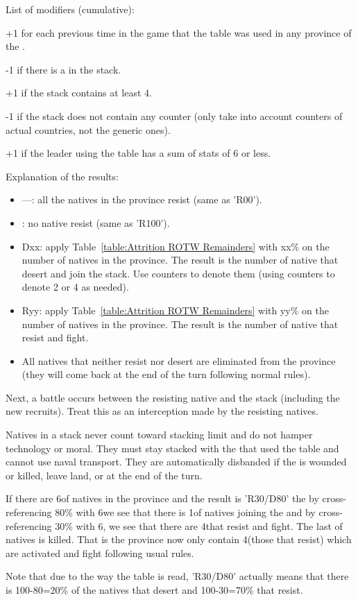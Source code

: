 List of modifiers (cumulative):
\begin{modlist}
\item[+1] for each previous time in the game that the table was used in any
  province of the \Area.
\item[-1] if there is a \LeaderMis in the stack.
\item[+1] if the stack contains at least 4\LD.
\item[-1] if the stack does not contain any \ARMY counter (only take into
  account counters of actual countries, not the generic  ones).
\item[+1] if the leader using the table has a sum of stats of 6 or less.
\end{modlist}

Explanation of the results:
\begin{itemize}
\item ---: all the natives in the province resist (same as 'R00').
\item \textdag: no native resist (same as 'R100').
\item Dxx: apply Table~\ref{table:Attrition ROTW Remainders} with xx\% on the
  number of natives in the province. The result is the number of native \LD
  that desert and join the stack. Use  counters to denote them
  (using \ARMY counters to denote 2 or 4 \LD as needed).
\item Ryy: apply Table~\ref{table:Attrition ROTW Remainders} with yy\% on the
  number of natives in the province. The result is the number of native \LD
  that resist and fight.
\item All natives that neither resist nor desert are eliminated from the
  province (they will come back at the end of the turn following normal
  rules).
\end{itemize}

Next, a battle occurs between the resisting native and the stack (including
the new recruits). Treat this as an interception made by the resisting
natives.

Natives in a stack never count toward stacking limit and do not hamper
technology or moral. They must stay stacked with the \LeaderC that used the
table and cannot use naval transport. They are automatically disbanded if the
\LeaderC is wounded or killed, leave land, or at the end of the turn.

\begin{exemple}
  If there are 6\LD of natives in the province and the result is 'R30/D80' the
  by cross-referencing 80\% with 6\LD we see that there is 1\LD of natives
  joining the \LeaderC and by cross-referencing 30\% with 6\LD, we see that
  there are 4\LD that resist and fight. The last \LD of natives is
  killed. That is the province now only contain 4\LD (those that resist) which
  are activated and fight following usual rules.

  Note that due to the way the table is read, 'R30/D80' actually means that
  there is 100-80=20\% of the natives that desert and 100-30=70\% that resist.
\end{exemple}

